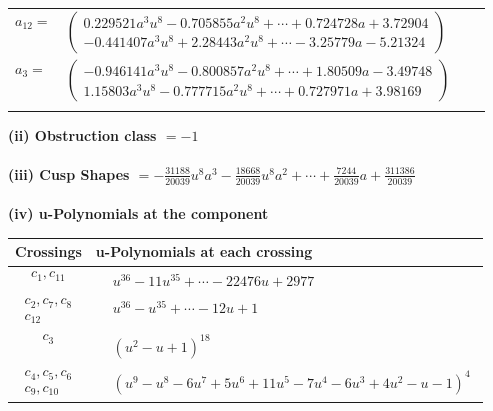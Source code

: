 \documentclass[1p]{elsarticle_modified}
\theoremstyle{definition}
\begin{document}
\begin{tabular}{m{7pt} m{180pt} m{7pt} m{180pt} }
\flushright $a_{12}=$&$\begin{pmatrix}0.229521 a^{3} u^{8}-0.705855 a^{2} u^{8}+\cdots+0.724728 a+3.72904\\-0.441407 a^{3} u^{8}+2.28443 a^{2} u^{8}+\cdots-3.25779 a-5.21324\end{pmatrix}$ \\
\flushright $a_{3}=$&$\begin{pmatrix}-0.946141 a^{3} u^{8}-0.800857 a^{2} u^{8}+\cdots+1.80509 a-3.49748\\1.15803 a^{3} u^{8}-0.777715 a^{2} u^{8}+\cdots+0.727971 a+3.98169\end{pmatrix}$\\&\end{tabular}
\flushleft \textbf{(ii) Obstruction class $= -1$}\\~\\
\flushleft \textbf{(iii) Cusp Shapes $= -\frac{31188}{20039} u^8 a^3-\frac{18668}{20039} u^8 a^2+\cdots+\frac{7244}{20039} a+\frac{311386}{20039}$}\\~\\
\newpage\renewcommand{\arraystretch}{1}
\flushleft \textbf{(iv) u-Polynomials at the component}\newline \\
\begin{tabular}{m{50pt}|m{274pt}}
Crossings & \hspace{64pt}u-Polynomials at each crossing \\
\hline $$\begin{aligned}c_{1},c_{11}\end{aligned}$$&$\begin{aligned}
&u^{36}-11 u^{35}+\cdots-22476 u+2977
\end{aligned}$\\
\hline $$\begin{aligned}c_{2},c_{7},c_{8}\\c_{12}\end{aligned}$$&$\begin{aligned}
&u^{36}- u^{35}+\cdots-12 u+1
\end{aligned}$\\
\hline $$\begin{aligned}c_{3}\end{aligned}$$&$\begin{aligned}
&(u^2- u+1)^{18}
\end{aligned}$\\
\hline $$\begin{aligned}c_{4},c_{5},c_{6}\\c_{9},c_{10}\end{aligned}$$&$\begin{aligned}
&(u^9- u^8-6 u^7+5 u^6+11 u^5-7 u^4-6 u^3+4 u^2- u-1)^4
\end{aligned}$\\
\hline
\end{tabular}\\~\\
\end{document}
